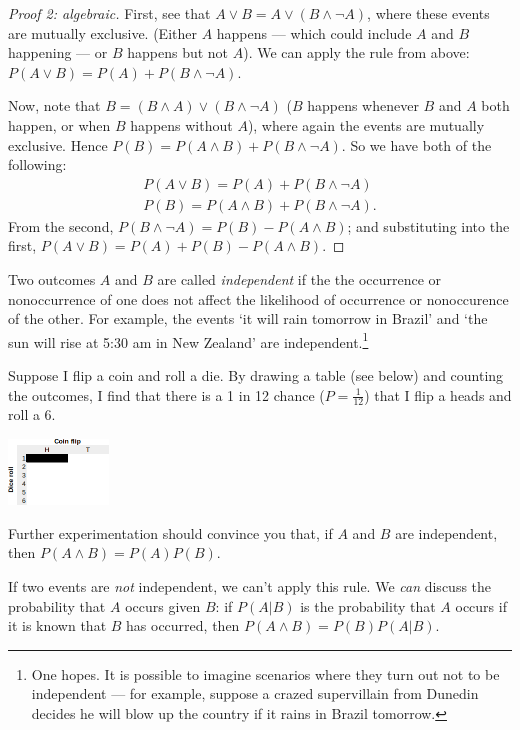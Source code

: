 \begin{proof}[Proof 2: algebraic]
  First, see that $ A \vee B = A \vee (B \wedge \neg A) $, where these events are mutually exclusive. (Either $ A $
  happens --- which could include $ A $ and $ B $ happening --- or $ B $ happens but not $ A $). We can apply the rule
  from above: $ P(A \vee B) = P(A) + P(B \wedge \neg A) $.

  Now, note that $ B = (B \wedge A) \vee (B \wedge \neg A) $ ($ B $ happens whenever $ B $ and $ A $ both happen, or
  when $ B $ happens without $ A $), where again the events are mutually exclusive. Hence $ P(B) = P(A \wedge B) + P(B \wedge \neg A) $.
  So we have both of the following:
  \begin{gather*}
    P(A \vee B) = P(A) + P(B \wedge \neg A)\\
    P(B) = P(A \wedge B) + P(B \wedge \neg A).
  \end{gather*}
  From the second, $ P(B \wedge \neg A) = P(B) - P(A \wedge B) $; and substituting into the first, $ P(A \vee B) = P(A) + P(B) - P(A \wedge B) $.
\end{proof}

Two outcomes $ A $ and $ B $ are called \emph{independent} if the the occurrence or nonoccurrence of one
does not affect the likelihood of occurrence or nonoccurence of the other. For example, the events `it will rain tomorrow in Brazil'
and `the sun will rise at 5:30 am in New Zealand' are independent.\footnote{One hopes. It is possible to imagine scenarios where they
turn out not to be independent --- for example, suppose a crazed supervillain from Dunedin decides he will blow up the country if it
rains in Brazil tomorrow.}

Suppose I flip a coin and roll a die. By drawing a table (see below) and counting the outcomes, I find that there
is a 1 in 12 chance ($ P = \frac{1}{12} $) that I flip a heads and roll a 6.

\begin{center}
  \includegraphics[width=0.2\textwidth]{independence}
\end{center}

Further experimentation should convince you that, if $ A $ and $ B $ are independent, then $ P(A \wedge B) = P(A) P(B) $.

If two events are \emph{not} independent, we can't apply this rule. We \emph{can} discuss the probability that $ A $ occurs
given $ B $: if $ P(A | B) $ is the probability that $ A $ occurs if it is known that $ B $ has occurred, then $ P(A \wedge B) = P(B) P(A | B) $.


